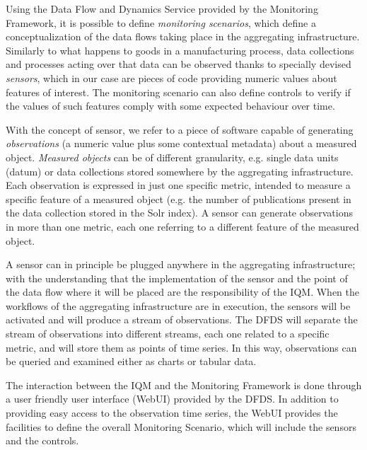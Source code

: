 \documentclass[amsthm,ebook]{saparticle}
\begin{document}
Using the Data Flow and Dynamics Service provided by the Monitoring Framework, it is possible to define \textit{monitoring scenarios}, which define a conceptualization of the data flows taking place in the aggregating infrastructure. Similarly to what happens to goods in a manufacturing process, data collections and processes acting over that data can be observed thanks to specially devised \textit{sensors}, which in our case are pieces of code providing numeric values about features of interest. The monitoring scenario can also define controls to verify if the values of such features comply with some expected behaviour over time.

With the concept of sensor, we refer to a piece of software capable of generating \textit{observations} (a numeric value plus some contextual metadata) about a measured object. \textit{Measured objects} can be of different granularity, e.g. single data units (datum) or data collections stored somewhere by the aggregating infrastructure. Each observation is expressed in just one specific metric, intended to measure a specific feature of a measured object (e.g. the number of publications present in the data collection stored in the Solr index). A sensor can generate observations in more than one metric, each one referring to a different feature of the measured object. 

A sensor can in principle be plugged anywhere in the aggregating infrastructure; with the understanding that the implementation of the sensor and the point of the data flow where it will be placed are the responsibility of the IQM. When the workflows of the aggregating infrastructure are in execution, the sensors will be activated and will produce a stream of observations. The DFDS will separate the stream of observations into different streams, each one related to a specific metric, and will store them as points of time series. In this way, observations can be queried and examined either as charts or tabular data.

The interaction between the IQM and the Monitoring Framework is done through a user friendly user interface (WebUI) provided by the DFDS. In addition to providing easy access to the observation time series, the WebUI provides the facilities to define the overall Monitoring Scenario, which will include the sensors and the controls. 
\end{document}
